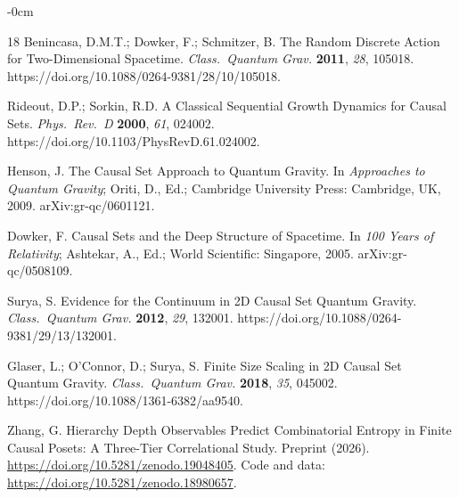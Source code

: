 \documentclass[entropy,article,submit,pdftex,moreauthors]{Definitions/mdpi}
\begin{document}
\begin{adjustwidth}{-\extralength}{0cm}
\begin{thebibliography}{18}
Benincasa, D.M.T.; Dowker, F.; Schmitzer, B.
The Random Discrete Action for Two-Dimensional Spacetime.
\textit{Class.\ Quantum Grav.} \textbf{2011}, \textit{28}, 105018.
https://doi.org/10.1088/0264-9381/28/10/105018.

Rideout, D.P.; Sorkin, R.D.
A Classical Sequential Growth Dynamics for Causal Sets.
\textit{Phys.\ Rev.\ D} \textbf{2000}, \textit{61}, 024002.
https://doi.org/10.1103/PhysRevD.61.024002.

Henson, J.
The Causal Set Approach to Quantum Gravity.
In \textit{Approaches to Quantum Gravity}; Oriti, D., Ed.; Cambridge University Press: Cambridge, UK, 2009.
arXiv:gr-qc/0601121.

Dowker, F.
Causal Sets and the Deep Structure of Spacetime.
In \textit{100 Years of Relativity}; Ashtekar, A., Ed.; World Scientific: Singapore, 2005.
arXiv:gr-qc/0508109.

Surya, S.
Evidence for the Continuum in 2D Causal Set Quantum Gravity.
\textit{Class.\ Quantum Grav.} \textbf{2012}, \textit{29}, 132001.
https://doi.org/10.1088/0264-9381/29/13/132001.

Glaser, L.; O'Connor, D.; Surya, S.
Finite Size Scaling in 2D Causal Set Quantum Gravity.
\textit{Class.\ Quantum Grav.} \textbf{2018}, \textit{35}, 045002.
https://doi.org/10.1088/1361-6382/aa9540.

Zhang, G.
Hierarchy Depth Observables Predict Combinatorial Entropy in Finite Causal Posets: A Three-Tier Correlational Study.
Preprint (2026). \url{https://doi.org/10.5281/zenodo.19048405}.
Code and data: \url{https://doi.org/10.5281/zenodo.18980657}.

\end{thebibliography}

\end{adjustwidth}
\end{document}
